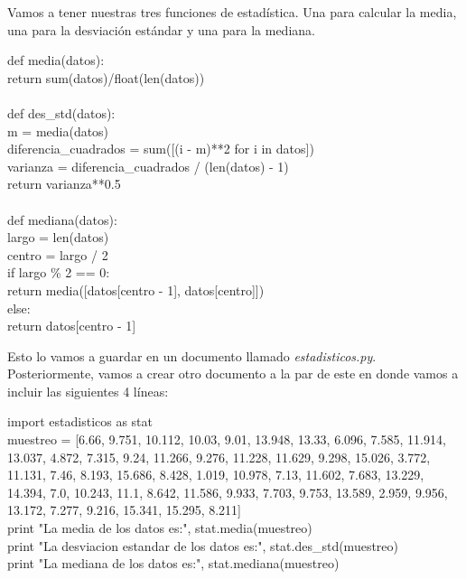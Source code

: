 \documentclass[10pt,letterpaper]{article}
\newenvironment{Code}
{
\begin{lrbox}{\selvestebox}%
\begin{minipage}{\dimexpr\columnwidth-2\fboxsep\relax}
\fontfamily{\ttdefault}\selectfont
}
{\end{minipage}\end{lrbox}%
\begin{center}
\colorbox{light-gray}{\usebox{\selvestebox}}
\end{center}
}
\begin{document}
Vamos a tener nuestras tres funciones de estad\'istica. Una para calcular la media, una para la desviaci\'on est\'andar y una para la mediana.

\begin{Code}
def media(datos):\\
\hspace*{6mm} return sum(datos)/float(len(datos))\\
\ \\
def des\_std(datos):\\
\hspace*{6mm} m = media(datos)\\
\hspace*{6mm} diferencia\_cuadrados = sum([(i - m)**2 for i in datos])\\
\hspace*{6mm} varianza = diferencia\_cuadrados / (len(datos) - 1)\\
\hspace*{6mm} return varianza**0.5\\
\ \\
def mediana(datos):\\
\hspace*{6mm} largo = len(datos)\\
\hspace*{6mm} centro = largo / 2\\
\hspace*{6mm} if largo \% 2 == 0:\\
\hspace*{13mm} return media([datos[centro - 1], datos[centro]])\\
\hspace*{6mm} else:\\
\hspace*{13mm} return datos[centro - 1]
\end{Code}

Esto lo vamos a guardar en un documento llamado \emph{estadisticos.py}. Posteriormente, vamos a crear otro documento a la par de este en donde vamos a incluir las siguientes 4 l\'ineas:

\begin{Code}
import estadisticos as stat\\
muestreo = [6.66, 9.751, 10.112, 10.03, 9.01, 13.948, 13.33, 6.096, 7.585, 11.914, 13.037, 4.872, 7.315, 9.24, 11.266, 9.276, 11.228, 11.629, 9.298, 15.026, 3.772, 11.131, 7.46, 8.193, 15.686, 8.428, 1.019, 10.978, 7.13, 11.602, 7.683, 13.229, 14.394, 7.0, 10.243, 11.1, 8.642, 11.586, 9.933, 7.703, 9.753, 13.589, 2.959, 9.956, 13.172, 7.277, 9.216, 15.341, 15.295, 8.211]\\
print "La media de los datos es:", stat.media(muestreo)\\
print "La desviacion estandar de los datos es:", stat.des\_std(muestreo)\\
print "La mediana de los datos es:", stat.mediana(muestreo)\\
\end{Code}
\end{document}
